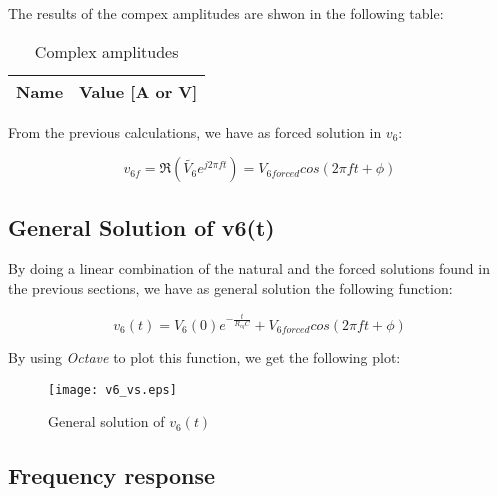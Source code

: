 \hfill


The results of the compex amplitudes are shwon in the following table:

\begin{table}[b]
  \centering
  \begin{tabular}{|l|r|}
    \hline
    {\bf Name} & {\bf Value [A or V]} \\ \hline
    
  \end{tabular}
  \caption{Complex amplitudes}
  \label{tab:op_tabNodal}
\end{table}


From the previous calculations, we have as forced solution in $v_6$:

\begin{equation}
  v_{6f} = \Re (\tilde{V_6} e^{j 2\pi f t}) = V_{6forced} cos(2 \pi f t + \phi)
  \label{forcedSolution}
\end{equation}


\subsection{General Solution of v6(t)}

By doing a linear combination of the natural and the forced solutions found in the previous sections, we have as general solution the following function:

\begin{equation}
  v_6(t) = V _6(0)e^{-\frac{t}{R_{eq}C}} + V_{6forced} cos(2 \pi f t + \phi)
  \label{finalSolution}
\end{equation}

By using \textit{Octave} to plot this function, we get the following plot:

\begin{figure}[h] \centering
  \texttt{[image: v6\_vs.eps]}
  \caption{General solution of $v_6(t)$ }
  \label{fig:finalSolution}
\end{figure}



\subsection{Frequency response}



